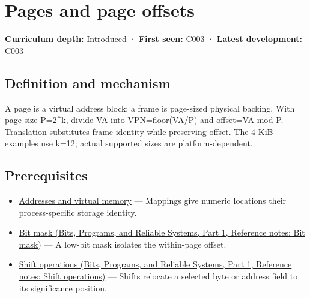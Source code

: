 \hypertarget{appendix-0c67cd5bf30a}{}\label{referencestart:appendix-0c67cd5bf30a}
\section{Pages and page offsets}\label{appendix-0c67cd5bf30a-pages-and-page-offsets}

\hypertarget{appendix-0c67cd5bf30a-pages-and-page-offsets}{}

\textbf{Curriculum depth:} Introduced · \textbf{First seen:} C003 · \textbf{Latest development:} C003

\begin{allmightroledefinition}

\subsection{Definition and mechanism}\label{appendix-0c67cd5bf30a-definition-and-mechanism}

\hypertarget{appendix-0c67cd5bf30a-definition-and-mechanism}{}

A page is a virtual address block; a frame is page-sized physical backing. With page size P=2\^{}k, divide VA into VPN=floor(VA/P) and offset=VA mod P. Translation substitutes frame identity while preserving offset. The 4-KiB examples use k=12; actual supported sizes are platform-dependent.

\end{allmightroledefinition}

\subsection{Prerequisites}\label{appendix-0c67cd5bf30a-prerequisites}

\hypertarget{appendix-0c67cd5bf30a-prerequisites}{}

\begin{itemize}
\tightlist
\item
  \hyperref[appendix-18ee4f913c3c]{Addresses and virtual memory} --- Mappings give numeric locations their process-specific storage identity.
\item
  \href{../01-Bits-Programs-and-Reliable-Systems-P01/main.pdf\#appendix-dbe5905163c2}{Bit mask (Bits, Programs, and Reliable Systems, Part 1, Reference notes: Bit mask)} --- A low-bit mask isolates the within-page offset.
\item
  \href{../01-Bits-Programs-and-Reliable-Systems-P01/main.pdf\#appendix-73425b25118e}{Shift operations (Bits, Programs, and Reliable Systems, Part 1, Reference notes: Shift operations)} --- Shifts relocate a selected byte or address field to its significance position.
\end{itemize}

